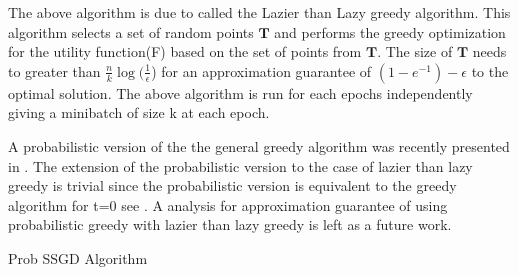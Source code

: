\documentclass[a4paper,twoside]{iiththesis}
\theoremstyle{definition}
\theoremstyle{definition}
\theoremstyle{remark}
\begin{document}
The above algorithm is due to \cite{mirzasoleiman2015lazier} called the Lazier than Lazy greedy algorithm. This algorithm selects a set of random points $\mathbf{T}$ and performs the greedy optimization for the utility function(F) based on the set of points from $\mathbf{T}$. The size of $\mathbf{T}$ needs to greater than $\frac{n}{k} \log(\frac{1}{\epsilon}$) for an approximation guarantee of $(1 - e^{-1}) - \epsilon$ to the optimal solution. The above algorithm is run for each epochs independently giving a minibatch of size k at each epoch. 

A probabilistic version of the the general greedy algorithm was recently  presented in \cite{tschiatschek2018differentiable}. The extension of the probabilistic version to the case of lazier than lazy greedy is trivial since the probabilistic version is equivalent to the greedy algorithm for t=0 see \cite{tschiatschek2018differentiable}. A analysis for approximation guarantee of using probabilistic greedy with lazier than lazy greedy is left as a future work.
\begin{algorithm}[!htb]
\caption{Prob SSGD Algorithm}
\label{sSGD-2}
\end{algorithm}
\end{document}
